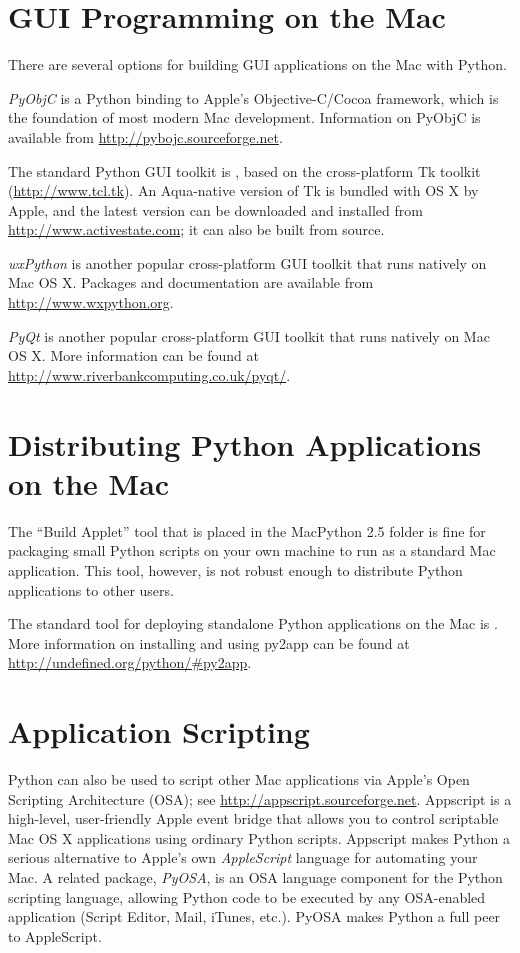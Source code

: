 \section{GUI Programming on the Mac}

There are several options for building GUI applications on the Mac with Python.

\emph{PyObjC} is a Python binding to Apple's Objective-C/Cocoa framework, which
is the foundation of most modern Mac development. Information on PyObjC is
available from \url{http://pybojc.sourceforge.net}.

The standard Python GUI toolkit is , based on the cross-platform
Tk toolkit (\url{http://www.tcl.tk}). An Aqua-native version of Tk is bundled
with OS X by Apple, and the latest version can be downloaded and installed from
\url{http://www.activestate.com}; it can also be built from source.

\emph{wxPython} is another popular cross-platform GUI toolkit that runs natively
on Mac OS X. Packages and documentation are available from
\url{http://www.wxpython.org}.

\emph{PyQt} is another popular cross-platform GUI toolkit that runs natively on
Mac OS X. More information can be found at
\url{http://www.riverbankcomputing.co.uk/pyqt/}.


\section{Distributing Python Applications on the Mac}

The ``Build Applet'' tool that is placed in the MacPython 2.5 folder is fine for
packaging small Python scripts on your own machine to run as a standard Mac
application. This tool, however, is not robust enough to distribute Python
applications to other users.

The standard tool for deploying standalone Python applications on the Mac is
. More information on installing and using py2app can be found
at \url{http://undefined.org/python/#py2app}.

\section{Application Scripting}

Python can also be used to script other Mac applications via Apple's Open
Scripting Architecture (OSA); see
\url{http://appscript.sourceforge.net}. Appscript is a high-level, user-friendly
Apple event bridge that allows you to control scriptable Mac OS X applications
using ordinary Python scripts. Appscript makes Python a serious alternative to
Apple's own \emph{AppleScript} language for automating your Mac. A related
package, \emph{PyOSA}, is an OSA language component for the Python scripting
language, allowing Python code to be executed by any OSA-enabled application
(Script Editor, Mail, iTunes, etc.). PyOSA makes Python a full peer to
AppleScript.

